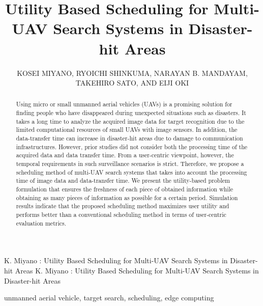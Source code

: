 \documentclass{ieeeaccess}
\begin{document}
\title{Utility Based Scheduling for Multi-UAV Search Systems in Disaster-hit Areas}

\author{\uppercase{Kosei MIYANO, Ryoichi SHINKUMA, NARAYAN B. MANDAYAM, Takehiro SATO, and Eiji OKI}}
\address[1]{Graduate School of Informatics, Kyoto University, Yoshida-honmachi, Sakyo-ku, Kyoto 606-8501, Japan}
\address[2]{Wireless Information Network Laboratory (WINLAB), Rutgers University, 671 Route 1 South, North Brunswick, NJ, 08902-3390, USA}

\markboth
{K. Miyano \headeretal: Utility Based Scheduling for Multi-UAV Search Systems in Disaster-hit Areas}
{K. Miyano \headeretal: Utility Based Scheduling for Multi-UAV Search Systems in Disaster-hit Areas}


\begin{IEEEkeywords}
unmanned aerial vehicle, target search, scheduling, edge computing
\end{IEEEkeywords}

\begin{abstract}
Using micro or small unmanned aerial vehicles (UAVs) is a promising solution for finding people who have disappeared during unexpected situations such as disasters.
 It takes a long time to analyze the acquired image data for target recognition due to the limited computational resources of small UAVs with image sensors.
In addition, the data-transfer time can increase in disaster-hit areas due to damage to communication infrastructures. However, prior studies did not consider both the processing time of the acquired data and data transfer time.  From a user-centric viewpoint, however, the temporal requirements in such surveillance scenarios is strict. Therefore, we propose a scheduling method of multi-UAV search systems that takes into account the processing time of image data and data-transfer time. We present the utility-based problem formulation that ensures the freshness of each piece of obtained information while obtaining as many pieces of information as possible for a certain period. Simulation results indicate that the proposed scheduling method maximizes user utility and performs better than a conventional scheduling method in terms of user-centric evaluation metrics.

\end{abstract}
\end{document}

